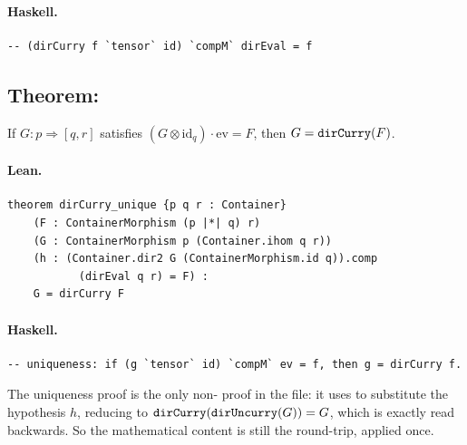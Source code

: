 \documentclass[11pt,a4paper]{article}
\begin{document}
\paragraph{Haskell.}
\begin{lstlisting}[style=haskell]
-- (dirCurry f `tensor` id) `compM` dirEval = f
\end{lstlisting}


\subsection{Theorem: }

\begin{thm}
If $G : p \Rightarrow [q, r]$ satisfies
$(G \otimes \mathrm{id}_q) \cdot \mathrm{ev} = F$,
then $G = \texttt{dirCurry}(F)$.
\end{thm}

\paragraph{Lean.}
\begin{lstlisting}[style=lean]
theorem dirCurry_unique {p q r : Container}
    (F : ContainerMorphism (p |*| q) r)
    (G : ContainerMorphism p (Container.ihom q r))
    (h : (Container.dir2 G (ContainerMorphism.id q)).comp
           (dirEval q r) = F) :
    G = dirCurry F
\end{lstlisting}

\paragraph{Haskell.}
\begin{lstlisting}[style=haskell]
-- uniqueness: if (g `tensor` id) `compM` ev = f, then g = dirCurry f.
\end{lstlisting}

\begin{fidelitynote}
The uniqueness proof is the only non- proof in the file: it uses
 to substitute the hypothesis $h$, reducing to
$\texttt{dirCurry}(\texttt{dirUncurry}(G)) = G$, which is exactly
 read backwards.  So the mathematical content is
still the round-trip, applied once.
\end{fidelitynote}
\end{document}
